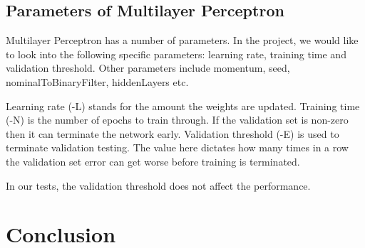 \documentclass[11pt]{article}
\begin{document}
\subsection{Parameters of Multilayer Perceptron}
Multilayer Perceptron has a number of parameters. In the project, we would like to look into the following specific parameters: learning rate, training time and validation threshold. Other parameters include momentum, seed, nominalToBinaryFilter, hiddenLayers etc.

Learning rate (-L) stands for the amount the weights are updated. Training time (-N) is the number of epochs to train through. If the validation set is non-zero then it can terminate the network early. Validation threshold (-E) is used to terminate validation testing. The value here dictates how many times in a row the validation set error can get worse before training is terminated.

In our tests, the validation threshold does not affect the performance.
 
\section{Conclusion}



\newpage


\end{document}
